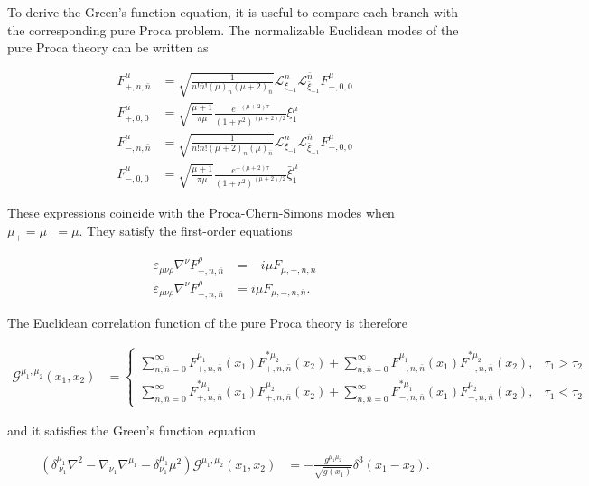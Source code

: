 To derive the Green's function equation, it is useful to compare each branch with the corresponding pure Proca problem. The normalizable Euclidean modes of the pure Proca theory can be written as

\begin{align}
F_{+,n,\bar{n}}^{\mu} & =\sqrt{ \frac{1}{n!\bar{n}!(\mu)_{n}(\mu+2)_{\bar{n}}} }\mathcal{L}_{\xi _{-1}}^{n}\mathcal{L}_{\bar{\xi}_{-1}}^{\bar{n}}F_{+,0,0}^{\mu} \\
F_{+,0,0}^{\mu} & =\sqrt{ \frac{\mu +1}{\pi \mu} } \frac{e^{-(\mu +2)\tau}}{(1+r^{2})^{(\mu +2)/2}}\xi _{1}^{\mu} \\
F_{-,n,\bar{n}}^{\mu} & =\sqrt{ \frac{1}{n!\bar{n}!(\mu+2)_{n}(\mu)_{\bar{n}}} }\mathcal{L}_{\xi _{-1}}^{n}\mathcal{L}_{\bar{\xi}_{-1}}^{\bar{n}}F_{-,0,0}^{\mu} \\
F_{-,0,0}^{\mu} & =\sqrt{ \frac{\mu +1}{\pi \mu} } \frac{e^{-(\mu +2)\tau}}{(1+r^{2})^{(\mu +2)/2}}\bar{\xi} _{1}^{\mu}
\end{align}

These expressions coincide with the Proca-Chern-Simons modes when $\mu_{+}=\mu_{-}=\mu$. They satisfy the first-order equations

\begin{align}
\varepsilon _{\mu \nu \rho}\nabla ^{\nu}F^{\rho}_{+,n,\bar{n}} & =-i\mu F_{\mu,+,n,\bar{n}} \\
\varepsilon _{\mu \nu \rho}\nabla ^{\nu}F^{\rho}_{-,n,\bar{n}} & =i\mu F_{\mu,-,n,\bar{n}}.
\end{align}

The Euclidean correlation function of the pure Proca theory is therefore

\begin{align}
\mathcal{G}^{\mu_{1},\mu_{2}}(x_{1},x_{2}) & =\begin{cases}
\sum ^{\infty}_{n,\bar{n}=0}F^{\mu_{1}}_{+,n,\bar{n}}(x_{1})F^{*\mu_{2}}_{+,n,\bar{n}}(x_{2})+\sum ^{\infty}_{n,\bar{n}=0}F^{\mu_{1}}_{-,n,\bar{n}}(x_{1})F^{*\mu_{2}}_{-,n,\bar{n}}(x_{2}), & \tau _{1}>\tau _{2} \\
\sum ^{\infty}_{n,\bar{n}=0}F^{*\mu_{1}}_{+,n,\bar{n}}(x_{1})F^{\mu_{2}}_{+,n,\bar{n}}(x_{2})+\sum ^{\infty}_{n,\bar{n}=0}F^{*\mu_{1}}_{-,n,\bar{n}}(x_{1})F^{\mu_{2}}_{-,n,\bar{n}}(x_{2}), & \tau _{1}<\tau _{2}
\end{cases}
\end{align}

and it satisfies the Green's function equation

\begin{align}
(\delta ^{\mu_{1}}_{~\nu_{1}}\nabla ^{2}-\nabla _{\nu_{1}}\nabla ^{\mu_{1}}-\delta _{\nu_{1}}^{\mu_{1}}\mu ^{2})\mathcal{G}^{\mu_{1},\mu_{2}}(x_{1},x_{2}) & =-\frac{g^{\mu_{1}\mu_{2}}}{\sqrt{ g(x_{1}) }}\delta ^{3}(x_{1}-x_{2}).
\end{align}

